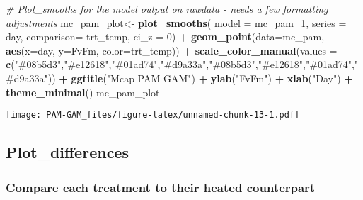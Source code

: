 \documentclass[
]{article}
\newenvironment{Shaded}{\begin{snugshade}}{\end{snugshade}}
\newcommand{\AttributeTok}[1]{\textcolor[rgb]{0.13,0.29,0.53}{#1}}
\newcommand{\CommentTok}[1]{\textcolor[rgb]{0.56,0.35,0.01}{\textit{#1}}}
\newcommand{\DecValTok}[1]{\textcolor[rgb]{0.00,0.00,0.81}{#1}}
\newcommand{\FunctionTok}[1]{\textcolor[rgb]{0.13,0.29,0.53}{\textbf{#1}}}
\newcommand{\NormalTok}[1]{#1}
\newcommand{\OtherTok}[1]{\textcolor[rgb]{0.56,0.35,0.01}{#1}}
\newcommand{\SpecialCharTok}[1]{\textcolor[rgb]{0.81,0.36,0.00}{\textbf{#1}}}
\newcommand{\StringTok}[1]{\textcolor[rgb]{0.31,0.60,0.02}{#1}}
\begin{document}
\begin{Shaded}
\begin{Highlighting}[]
\CommentTok{\# Plot\_smooths for the model output on rawdata {-} needs a few formatting adjustments}
\NormalTok{mc\_pam\_plot}\OtherTok{\textless{}{-}}
  \FunctionTok{plot\_smooths}\NormalTok{(}
  \AttributeTok{model =}\NormalTok{ mc\_pam\_1,}
\AttributeTok{series =}\NormalTok{ day,}
\AttributeTok{comparison=}\NormalTok{ trt\_temp,}
\AttributeTok{ci\_z =} \DecValTok{0}\NormalTok{) }\SpecialCharTok{+} 
  \FunctionTok{geom\_point}\NormalTok{(}\AttributeTok{data=}\NormalTok{mc\_pam, }
             \FunctionTok{aes}\NormalTok{(}\AttributeTok{x=}\NormalTok{day, }\AttributeTok{y=}\NormalTok{FvFm, }\AttributeTok{color=}\NormalTok{trt\_temp)) }\SpecialCharTok{+}
  \FunctionTok{scale\_color\_manual}\NormalTok{(}\AttributeTok{values =} \FunctionTok{c}\NormalTok{(}\StringTok{"\#08b5d3"}\NormalTok{,}\StringTok{"\#e12618"}\NormalTok{,}\StringTok{"\#01ad74"}\NormalTok{,}\StringTok{"\#d9a33a"}\NormalTok{,}\StringTok{"\#08b5d3"}\NormalTok{,}\StringTok{"\#e12618"}\NormalTok{,}\StringTok{"\#01ad74"}\NormalTok{,}\StringTok{"\#d9a33a"}\NormalTok{)) }\SpecialCharTok{+} 
  \FunctionTok{ggtitle}\NormalTok{(}\StringTok{"Mcap PAM GAM"}\NormalTok{) }\SpecialCharTok{+}
  \FunctionTok{ylab}\NormalTok{(}\StringTok{"FvFm"}\NormalTok{) }\SpecialCharTok{+}
  \FunctionTok{xlab}\NormalTok{(}\StringTok{"Day"}\NormalTok{) }\SpecialCharTok{+}
  \FunctionTok{theme\_minimal}\NormalTok{()}
\NormalTok{mc\_pam\_plot}
\end{Highlighting}
\end{Shaded}

\texttt{[image: PAM-GAM\_files/figure-latex/unnamed-chunk-13-1.pdf]}

\hypertarget{plot_differences-1}{%
\subsection{Plot\_differences}\label{plot_differences-1}}

\hypertarget{compare-each-treatment-to-their-heated-counterpart-1}{%
\subsubsection{Compare each treatment to their heated
counterpart}\label{compare-each-treatment-to-their-heated-counterpart-1}}
\end{document}
